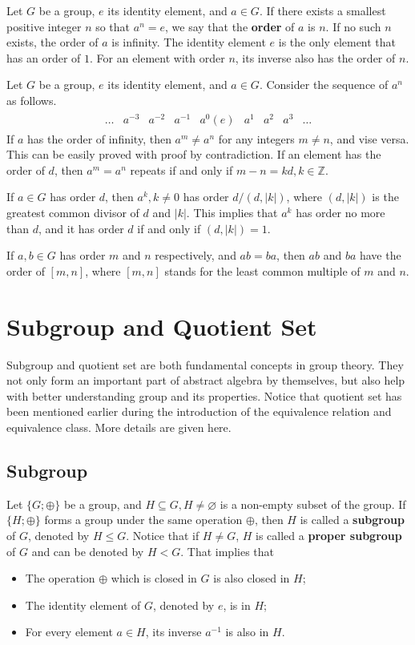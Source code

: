 Let $G$ be a group, $e$ its identity element, and $a\in G$. If there exists a smallest positive integer $n$ so that $a^n = e$, we say that the \textbf{order} of $a$ is $n$. If no such $n$ exists, the order of $a$ is infinity. The identity element $e$ is the only element that has an order of $1$. For an element with order $n$, its inverse also has the order of $n$.

Let $G$ be a group, $e$ its identity element, and $a\in G$. Consider the sequence of $a^n$ as follows.
\begin{eqnarray}
\begin{array}{ccccccccc}
  \ldots & a^{-3} & a^{-2} & a^{-1} & a^0 (e) & a^1 & a^2 & a^3 & \ldots \nonumber 
\end{array}
\end{eqnarray}
If $a$ has the order of infinity, then $a^m \neq a^n$ for any integers $m\neq n$, and vise versa. This can be easily proved with proof by contradiction. If an element has the order of $d$, then $a^m = a^n$ repeats if and only if $m-n = kd, k\in \mathbb{Z}$.

If $a \in G$ has order $d$, then $a^{k}, k\neq0$ has order $d/(d,|k|)$, where $(d,|k|)$ is the greatest common divisor of $d$ and $|k|$. This implies that $a^{k}$ has order no more than $d$, and it has order $d$ if and only if $(d,|k|)=1$.

If $a,b \in G$ has order $m$ and $n$ respectively, and $ab=ba$, then $ab$ and $ba$ have the order of $[m,n]$, where $[m,n]$ stands for the least common multiple of $m$ and $n$.

\section{Subgroup and Quotient Set}

Subgroup and quotient set are both fundamental concepts in group theory. They not only form an important part of abstract algebra by themselves, but also help with better understanding group and its properties. Notice that quotient set has been mentioned earlier during the introduction of the equivalence relation and equivalence class. More details are given here.

\subsection{Subgroup}

Let $\{G;\oplus\}$ be a group, and $H\subseteq G, H\neq\varnothing$ is a non-empty subset of the group. If $\{H;\oplus\}$ forms a group under the same operation $\oplus$, then $H$ is called a \textbf{subgroup} of $G$, denoted by $H\leq G$. Notice that if $H \neq G$, $H$ is called a \textbf{proper subgroup} of $G$ and can be denoted by $H<G$. That implies that
\begin{itemize}
  \item The operation $\oplus$ which is closed in $G$ is also closed in $H$;
  \item The identity element of $G$, denoted by $e$, is in $H$;
  \item For every element $a\in H$, its inverse $a^{-1}$ is also in $H$.
\end{itemize}

